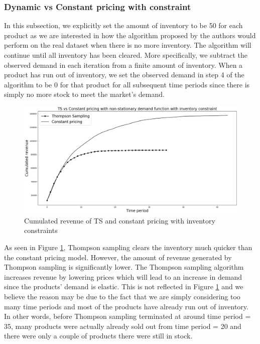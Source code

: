 \documentclass[a4paper]{article}
\begin{document}
\subsubsection{Dynamic vs Constant pricing with constraint}
In this subsection, we explicitly set the amount of inventory to be 50 for each product as we are interested in how the algorithm proposed by the authors would perform on the real dataset when there is no more inventory. The algorithm will continue until all inventory has been cleared. More specifically, we subtract the observed demand in each iteration from a finite amount of inventory. When a product has run out of inventory, we set the observed demand in step 4 of the algorithm to be 0 for that product for all subsequent time periods since there is simply no more stock to meet the market's demand.
\begin{figure}[h]
	\centering
	\includegraphics[width=1.03\textwidth]{4.png}
	\caption{\label{fig:five}Cumulated revenue of TS and constant pricing with inventory constraints}
\end{figure}
\newline
As seen in Figure \ref{fig:five}, Thompson sampling clears the inventory much quicker than the constant pricing model. However, the amount of revenue generated by Thompson sampling is significantly lower. The Thompson sampling algorithm increases revenue by lowering prices which will lead to an increase in demand since the products' demand is elastic. This is not reflected in Figure \ref{fig:five} and we believe the reason may be due to the fact that we are simply considering too many time periods and most of the products have already run out of inventory. In other words, before Thompson sampling terminated at around time period = 35, many products were actually already sold out from time period = 20 and there were only a couple of products there were still in stock.
\newline
\end{document}
